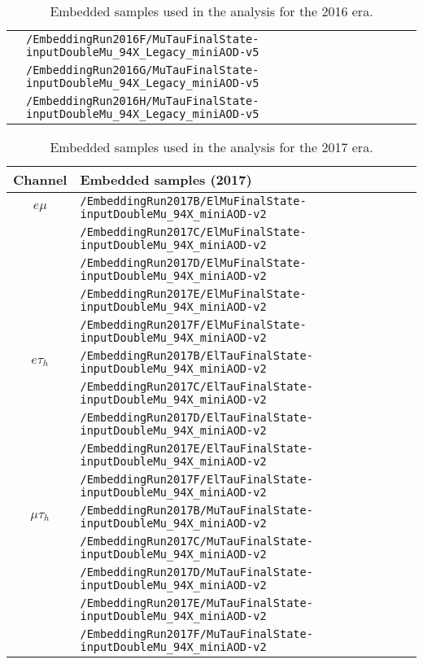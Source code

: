 \begin{table}[ht]
\begin{center}
{\begin{tabular}{|c|l|}
    & \texttt{/EmbeddingRun2016F/MuTauFinalState-inputDoubleMu\_94X\_Legacy\_miniAOD-v5}\\
    & \texttt{/EmbeddingRun2016G/MuTauFinalState-inputDoubleMu\_94X\_Legacy\_miniAOD-v5}\\
    & \texttt{/EmbeddingRun2016H/MuTauFinalState-inputDoubleMu\_94X\_Legacy\_miniAOD-v5}\\
    \hline
    \end{tabular}
    }
    \end{center}
    \caption{Embedded samples used in the analysis for the 2016 era.}
    \label{tab:2016emb}
    \end{table}
    
    \begin{table}[ht]
    \begin{center}
    {\scriptsize
    \begin{tabular}{|c|l|}
    \hline
    Channel & Embedded samples (2017)\\
    \hline
    $e\mu$ & \texttt{/EmbeddingRun2017B/ElMuFinalState-inputDoubleMu\_94X\_miniAOD-v2}\\
    & \texttt{/EmbeddingRun2017C/ElMuFinalState-inputDoubleMu\_94X\_miniAOD-v2}\\
    & \texttt{/EmbeddingRun2017D/ElMuFinalState-inputDoubleMu\_94X\_miniAOD-v2}\\
    & \texttt{/EmbeddingRun2017E/ElMuFinalState-inputDoubleMu\_94X\_miniAOD-v2}\\
    & \texttt{/EmbeddingRun2017F/ElMuFinalState-inputDoubleMu\_94X\_miniAOD-v2}\\
    \hline
    $e\tau_{h}$ & \texttt{/EmbeddingRun2017B/ElTauFinalState-inputDoubleMu\_94X\_miniAOD-v2}\\
    & \texttt{/EmbeddingRun2017C/ElTauFinalState-inputDoubleMu\_94X\_miniAOD-v2}\\
    & \texttt{/EmbeddingRun2017D/ElTauFinalState-inputDoubleMu\_94X\_miniAOD-v2}\\
    & \texttt{/EmbeddingRun2017E/ElTauFinalState-inputDoubleMu\_94X\_miniAOD-v2}\\
    & \texttt{/EmbeddingRun2017F/ElTauFinalState-inputDoubleMu\_94X\_miniAOD-v2}\\
    \hline
    $\mu\tau_{h}$ & \texttt{/EmbeddingRun2017B/MuTauFinalState-inputDoubleMu\_94X\_miniAOD-v2}\\
    & \texttt{/EmbeddingRun2017C/MuTauFinalState-inputDoubleMu\_94X\_miniAOD-v2}\\
    & \texttt{/EmbeddingRun2017D/MuTauFinalState-inputDoubleMu\_94X\_miniAOD-v2}\\
    & \texttt{/EmbeddingRun2017E/MuTauFinalState-inputDoubleMu\_94X\_miniAOD-v2}\\
    & \texttt{/EmbeddingRun2017F/MuTauFinalState-inputDoubleMu\_94X\_miniAOD-v2}\\
    \hline
    \end{tabular}
    }
    \end{center}
    \caption{Embedded samples used in the analysis for the 2017 era.}
    \label{tab:2017emb}
    \end{table}
    

